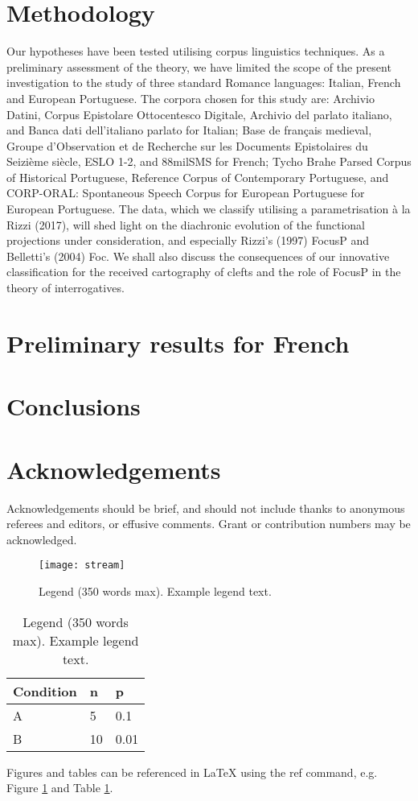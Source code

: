 \documentclass[fleqn,10pt]{wlscirep}
\begin{document}
\section*{Methodology}

Our hypotheses have been tested utilising corpus linguistics techniques. As a preliminary assessment of the theory, we have limited the scope of the present investigation to the study of three standard Romance languages: Italian, French and European Portuguese. The corpora chosen for this study are: Archivio Datini, Corpus Epistolare Ottocentesco Digitale, Archivio del parlato italiano, and Banca dati dell’italiano parlato for Italian; Base de français medieval, Groupe d’Observation et de Recherche sur les Documents Epistolaires du Seizième siècle, ESLO 1-2, and 88milSMS for French; Tycho Brahe Parsed Corpus of Historical Portuguese, Reference Corpus of Contemporary Portuguese, and CORP-ORAL: Spontaneous Speech Corpus for European Portuguese for European Portuguese.
The data, which we classify utilising a parametrisation à la Rizzi (2017), will shed light on the diachronic evolution of the functional projections under consideration, and especially Rizzi’s (1997) FocusP and Belletti’s (2004) Foc. We shall also discuss the consequences of our innovative classification for the received cartography of clefts and the role of FocusP in the theory of interrogatives. 

\section*{Preliminary results for French}


\section*{Conclusions}





\section*{Acknowledgements}

Acknowledgements should be brief, and should not include thanks to anonymous referees and editors, or effusive comments. Grant or contribution numbers may be acknowledged.

\begin{figure}[ht]
\centering
\texttt{[image: stream]}
\caption{Legend (350 words max). Example legend text.}
\label{fig:stream}
\end{figure}

\begin{table}[ht]
\centering
\begin{tabular}{|l|l|l|}
\hline
Condition & n & p \\
\hline
A & 5 & 0.1 \\
\hline
B & 10 & 0.01 \\
\hline
\end{tabular}
\caption{\label{tab:example}Legend (350 words max). Example legend text.}
\end{table}

Figures and tables can be referenced in LaTeX using the ref command, e.g. Figure \ref{fig:stream} and Table \ref{tab:example}.
\end{document}
